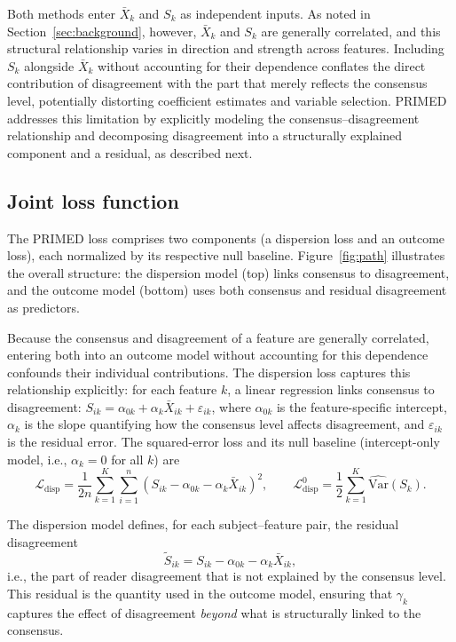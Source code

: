 \documentclass[referee,lineno,pdflatex,sn-vancouver-num]{sn-jnl}
\begin{document}
Both methods enter $\bar X_k$ and $S_k$ as independent inputs.
As noted in Section~\ref{sec:background}, however, $\bar X_k$ and $S_k$ are generally correlated, and this structural relationship varies in direction and strength across features.
Including $S_k$ alongside $\bar X_k$ without accounting for their dependence conflates the direct contribution of disagreement with the part that merely reflects the consensus level, potentially distorting coefficient estimates and variable selection.
PRIMED addresses this limitation by explicitly modeling the consensus--disagreement relationship and decomposing disagreement into a structurally explained component and a residual, as described next.

\subsection{Joint loss function}\label{sec:joint_loss}

The PRIMED loss comprises two components (a dispersion loss and an outcome loss), each normalized by its respective null baseline.
Figure~\ref{fig:path} illustrates the overall structure: the dispersion model (top) links consensus to disagreement, and the outcome model (bottom) uses both consensus and residual disagreement as predictors.

Because the consensus and disagreement of a feature are generally correlated, entering both into an outcome model without accounting for this dependence confounds their individual contributions.
The dispersion loss captures this relationship explicitly: for each feature $k$, a linear regression links consensus to disagreement:
$S_{ik} = \alpha_{0k} + \alpha_k \bar X_{ik} + \varepsilon_{ik}$,
where $\alpha_{0k}$ is the feature-specific intercept, $\alpha_k$ is the slope quantifying how the consensus level affects disagreement, and $\varepsilon_{ik}$ is the residual error.
The squared-error loss and its null baseline (intercept-only model, i.e., $\alpha_k = 0$ for all $k$) are
\[
  \mathcal{L}_{\mathrm{disp}} = \frac{1}{2n}\sum_{k=1}^K \sum_{i=1}^n (S_{ik} - \alpha_{0k} - \alpha_k \bar X_{ik})^2,
  \qquad
  \mathcal{L}_{\mathrm{disp}}^0 = \frac{1}{2}\sum_{k=1}^K \widehat{\mathrm{Var}}(S_k).
\]

The dispersion model defines, for each subject--feature pair, the residual disagreement
\[
  \tilde S_{ik} = S_{ik} - \alpha_{0k} - \alpha_k \bar X_{ik},
\]
i.e., the part of reader disagreement that is not explained by the consensus level.
This residual is the quantity used in the outcome model, ensuring that $\gamma_k$ captures the effect of disagreement \emph{beyond} what is structurally linked to the consensus.
\end{document}
